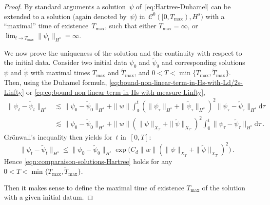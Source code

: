 \documentclass[12pt]{article}
\theoremstyle{plain}
\begin{document}
\begin{proof}
By standard arguments a solution~$\psi$ of~\eqref{eq:Hartree-Duhamel} can be extended to a solution (again denoted by~$\psi$) in~$\mathcal{C}^0([0,T_{\max}),H^s)$ with a ``maximal'' time of existence~$T_{\max}$, such that either $T_{\max} = \infty$, or~$\lim_{t\to T_{\max}}\|\psi_t\|_{H^s}=\infty$.


We now prove the uniqueness of the solution
and the continuity with respect to the initial data. Consider
two initial data $\psi_{0}$ and $\tilde{\psi}_{0}$ and corresponding
solutions $\psi$ and $\tilde{\psi}$ with maximal times $T_{\max}$
and $\tilde{T}_{\max}$, and $0<T<\min\{T_{\max},\tilde{T}_{\max}\}$. Then, using the Duhamel formula, \eqref{eq:bound-non-linear-term-in-Hs-with-Ld/2s-Linfty} or \eqref{eq:eq:bound-non-linear-term-in-Hs-with-measure-Linfty},
\begin{align*}
\|\psi_{t}-\tilde{\psi}_{t}\|_{H^{s}} & \lesssim\|\psi_{0}-\tilde{\psi}_{0}\|_{H^{s}}+\|w\|\int_{0}^{t}(\|\psi_{\tau}\|_{H^{s}}+\|\tilde{\psi}_{\tau}\|_{H^{s}})^{2}\|\psi_{\tau}-\tilde{\psi}_{\tau}\|_{H^{s}}\mathrm{d}\tau\\
 & \lesssim\|\psi_{0}-\tilde{\psi}_{0}\|_{H^{s}}+\|w\|(\|\psi\|_{X_{T}}+\|\tilde{\psi}\|_{X_{T}})^{2}\int_{0}^{t}\|\psi_{\tau}-\tilde{\psi}_{\tau}\|_{H^{s}}\mathrm{d}\tau\,.
\end{align*}
Grönwall's inequality then yields for~$t$ in~$[0,T]$:
\[
\|\psi_{t}-\tilde{\psi}_{t}\|_{H^{s}}\leq\|\psi_{0}-\tilde{\psi}_{0}\|_{H^{s}}\exp\big(C_d\|w\|(\|\psi\|_{X_{T}}+\|\tilde{\psi}\|_{X_{T}})^{2}\big)\,.
\]
Hence \eqref{eqn:comparaison-solutions-Hartree} holds for any $0<T<\min\{T_{\max} ,\tilde{T}_{\max}\}$.

Then it makes sense to define the maximal time of existence $T_{\max}$ of the solution with a given initial datum.


\end{proof}
\end{document}
